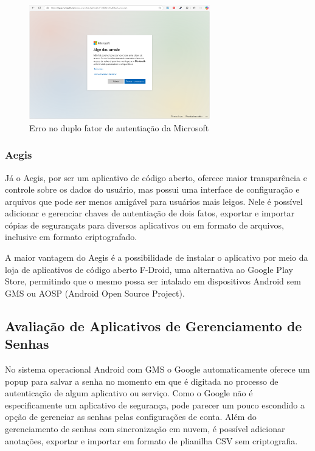 \documentclass[12pt]{article}
\begin{document}
\begin{figure}[h!]
  \centering
  \includegraphics[width=0.7\textwidth]{./assets/microsoft_error_2.png}
  \caption{Erro no duplo fator de autentiação da Microsoft}
  \label{fig:Microsoft2FactoryAutenticatorError}
\end{figure}

\subsubsection{Aegis}

Já o Aegis, por ser um aplicativo de código aberto, oferece maior transparência
e controle sobre os dados do usuário, mas possui uma interface de configuração
e arquivos que pode ser menos amigável para usuários mais leigos.
Nele é possível adicionar e gerenciar chaves de autentiação de dois fatos,
exportar e importar cópias de segurançats para diversos aplicativos ou em formato de arquivos,
inclusive em formato criptografado.

A maior vantagem do Aegis é a possibilidade de instalar o aplicativo por meio da
loja de aplicativos de código aberto F-Droid, uma alternativa ao Google Play
Store, permitindo que o mesmo possa ser intalado em dispositivos Android sem GMS
ou AOSP (Android Open Source Project).

\subsection{Avaliação de Aplicativos de Gerenciamento de Senhas}

No sistema operacional Android com GMS o Google automaticamente oferece um popup
para salvar a senha no momento em que é digitada no processo de autenticação de
algum aplicativo ou serviço.
Como o Google não é especificamente um aplicativo de segurança, pode parecer um
pouco escondido a opção de gerenciar as senhas pelas configurações de conta.
Além do gerenciamento de senhas com sincronização em nuvem, é possível adicionar
anotações, exportar e importar em formato de plianilha CSV sem criptografia.
\end{document}

